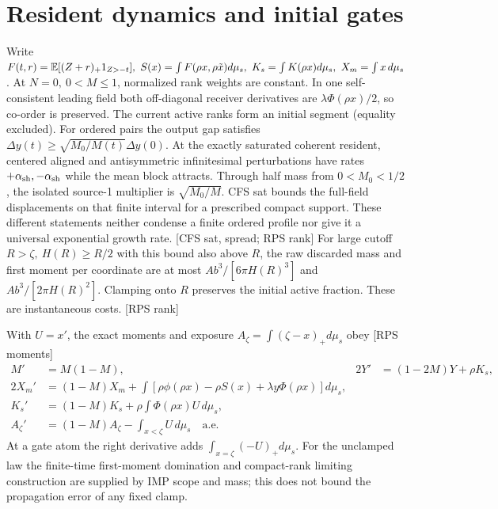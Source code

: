 \documentclass[11pt]{article}
\newcommand{\src}[1]{\textnormal{\small[#1]}}
\begin{document}
\section{Resident dynamics and initial gates}\label{an04rmsv1:package}
Write \(F(t,r)=\mathbb E[(Z+r)_+1_{Z>-t}],\
 S(x)=\int F(\rho x,\rho\tilde x)d\mu_s,\
 K_s=\int K(\rho x)d\mu_s,\ X_m=\int x\,d\mu_s\).
At \(N=0,\ 0<M\le1\), normalized rank weights are constant.
In one self-consistent leading field both off-diagonal receiver
derivatives are \(\lambda\Phi(\rho x)/2\), so co-order is preserved.
The current active ranks form an initial segment (equality excluded).
For ordered pairs the output gap satisfies
\(\Delta y(t)\ge\sqrt{M_0/M(t)}\Delta y(0)\).
At the exactly saturated coherent resident, centered aligned and
antisymmetric infinitesimal perturbations have rates
\(+\alpha_{\rm sh},-\alpha_{\rm sh}\) while the mean block attracts.
Through half mass from \(0<M_0<1/2\), the isolated source-1 multiplier
is \(\sqrt{M_0/M}\). CFS sat bounds the full-field displacements on
that finite interval for a prescribed compact support. These different
statements neither condense a finite ordered profile nor give it a
universal exponential growth rate. \src{CFS sat, spread; RPS rank}
For large cutoff \(R>\zeta,\ H(R)\ge R/2\) with this bound also
above \(R\), the raw discarded mass and first moment per coordinate
are at most \(Ab^3/[6\pi H(R)^3]\) and \(Ab^3/[2\pi H(R)^2]\).
Clamping onto \(R\) preserves the initial active fraction. These
are instantaneous costs. \src{RPS rank}

With \(U=x'\), the exact moments and exposure \(A_\zeta=\int(\zeta-x)_+d\mu_s\)
obey \src{RPS moments}
\begin{align*}
 M'&=M(1-M), &2Y'&=(1-2M)Y+\rho K_s,\\
 2X_m'&=(1-M)X_m+
 \int[\rho\phi(\rho x)-\rho S(x)+\lambda y\Phi(\rho x)]d\mu_s,\\
 K_s'&=(1-M)K_s+\rho\int\Phi(\rho x)U\,d\mu_s,\\
 A_\zeta'&=(1-M)A_\zeta-\int_{x<\zeta}U\,d\mu_s\quad\text{a.e.}
\end{align*}
At a gate atom the right derivative adds \(\int_{x=\zeta}(-U)_+d\mu_s\).
For the unclamped law the finite-time first-moment domination and
compact-rank limiting construction are supplied by IMP scope and mass;
this does not bound the propagation error of any fixed clamp.
\end{document}
